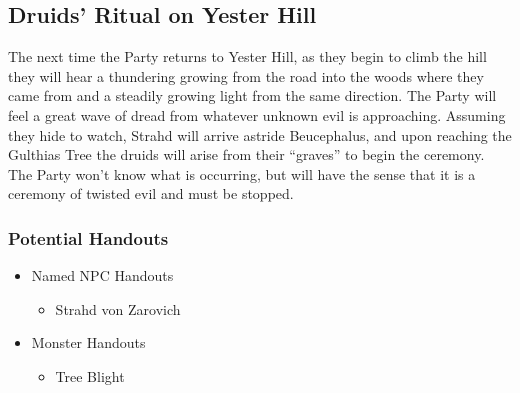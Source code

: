 \documentclass[a4paper,11pt]{article}
\begin{document}
\subsection{Druids' Ritual on Yester Hill}
The next time the Party returns to Yester Hill, as they begin to climb the hill they will hear a thundering 
growing from the road into the woods where they came from and a steadily growing light from the same direction. 
The Party will feel a great wave of dread from whatever unknown evil is approaching. Assuming they hide to watch, 
Strahd will arrive astride Beucephalus, and upon reaching the Gulthias Tree the druids will arise from their 
``graves'' to begin the ceremony. The Party won't know what is occurring, but will have the sense that it is a 
ceremony of twisted evil and must be stopped.
\subsubsection{Potential Handouts}
\begin{itemize}
  \item Named NPC Handouts
  \begin{itemize}
    \item Strahd von Zarovich
  \end{itemize}
  \item Monster Handouts
  \begin{itemize}
    \item Tree Blight
  \end{itemize}
\end{itemize}
\end{document}
